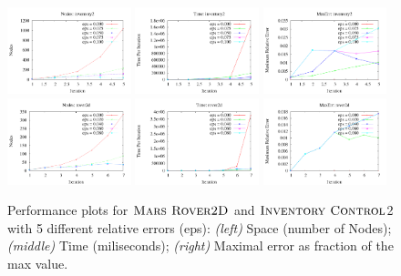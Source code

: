 \begin{figure}[tbph!]
\centering
\includegraphics[width=0.32\textwidth]{Figures/inventory/inventory2Nodes.pdf}
\hspace{1mm}
\includegraphics[width=0.32\textwidth]{Figures/inventory/inventory2Time.pdf}
\hspace{1mm}
\includegraphics[width=0.32\textwidth]{Figures/inventory/inventory2MaxErr.pdf}
\\
\vspace{5mm}
\includegraphics[width=0.32\textwidth]{Figures/rover2D/rover2d-Nodes.pdf}
\hspace{1mm}
\includegraphics[width=0.32\textwidth]{Figures/rover2D/rover2d-Time.pdf}
\hspace{1mm}
\includegraphics[width=0.32\textwidth]{Figures/rover2D/rover2d-MaxErr.pdf}
\caption{\footnotesize Performance plots for $\textsc{Mars Rover2D}$ and $\textsc{Inventory Control}$2 with 5 different relative errors (eps):
{\it (left)}  Space (number of Nodes);
{\it (middle)} Time (miliseconds);
{\it (right)} Maximal error as fraction of the max value.
}
\label{fig:Value}
\vspace{-5mm}
\end{figure}

